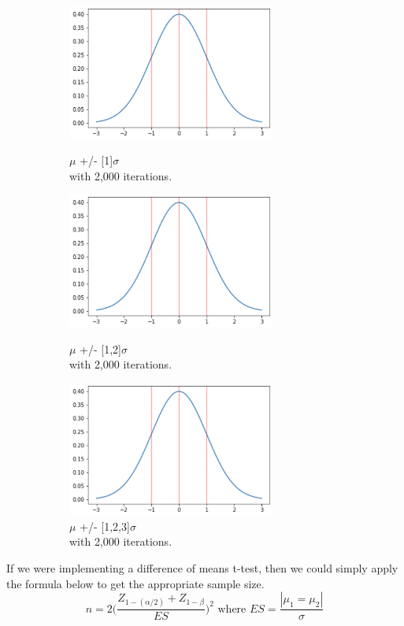 \documentclass[12pt]{article}
\begin{document}
\begin{figure}[b]
\begin{subfigure}{.32\textwidth}
\end{subfigure}
\begin{subfigure}{.32\textwidth}
    \centering
    \includegraphics[width=0.75\textwidth]{sd_3.png}
    \caption[short]{$\mu$ +/- [1]$\sigma$ \\with 2,000 iterations.}
    \includegraphics[width=0.75\textwidth]{sd_3.png}
    \caption[short]{$\mu$ +/- [1,2]$\sigma$ \\with 2,000 iterations.}
    \includegraphics[width=0.75\textwidth]{sd_3.png}
    \caption[short]{$\mu$ +/- [1,2,3]$\sigma$ \\with 2,000 iterations.}
\end{subfigure}%
\caption[short]{}
\end{figure}
\newpage
If we were implementing a difference of means t-test, then we could simply apply the formula below to get the appropriate sample size.
\[n = 2 \Bigg(\frac{Z_{1-(\alpha/2)}+Z_{1-\beta}}{ES}\Bigg)^2 \text{  where  } ES = \frac{|\mu_1=\mu_2|}{\sigma}\]
\end{document}

